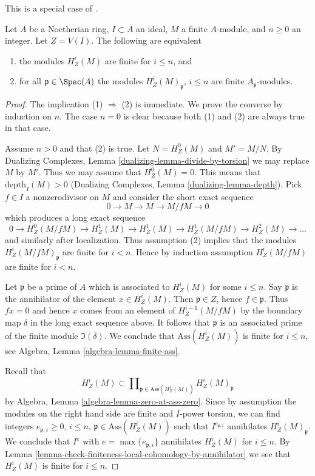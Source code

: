 \begin{lemma}
\label{lemma-check-finiteness-local-cohomology-locally}
\begin{reference}
This is a special case of \cite[Satz 1]{Faltings-finiteness}.
\end{reference}
Let $A$ be a Noetherian ring, $I \subset A$ an ideal, $M$ a finite
$A$-module, and $n \geq 0$ an integer. Let $Z = V(I)$.
The following are equivalent
\begin{enumerate}
\item the modules $H^i_Z(M)$ are finite for $i \leq n$, and
\item for all $\mathfrak p \in \Spec(A)$ the modules
$H^i_Z(M)_\mathfrak p$, $i \leq n$ are finite $A_\mathfrak p$-modules.
\end{enumerate}
\end{lemma}

\begin{proof}
The implication (1) $\Rightarrow$ (2) is immediate. We prove the converse
by induction on $n$. The case $n = 0$ is clear because both (1) and
(2) are always true in that case.

\medskip\noindent
Assume $n > 0$ and that (2) is true. Let $N = H^0_Z(M)$ and $M' = M/N$.
By Dualizing Complexes, Lemma \ref{dualizing-lemma-divide-by-torsion}
we may replace $M$ by $M'$.
Thus we may assume that $H^0_Z(M) = 0$.
This means that $\text{depth}_I(M) > 0$
(Dualizing Complexes, Lemma \ref{dualizing-lemma-depth}).
Pick $f \in I$ a nonzerodivisor on $M$ and consider the short
exact sequence
$$
0 \to M \to M \to M/fM \to 0
$$
which produces a long exact sequence
$$
0 \to H^0_Z(M/fM) \to H^1_Z(M) \to H^1_Z(M) \to H^1_Z(M/fM) \to
H^2_Z(M) \to \ldots
$$
and similarly after localization. Thus assumption (2) implies that
the modules $H^i_Z(M/fM)_\mathfrak p$ are finite for $i < n$. Hence
by induction assumption $H^i_Z(M/fM)$ are finite for $i < n$.

\medskip\noindent
Let $\mathfrak p$ be a prime of $A$ which is associated to
$H^i_Z(M)$ for some $i \leq n$. Say $\mathfrak p$ is the annihilator
of the element $x \in H^i_Z(M)$. Then $\mathfrak p \in Z$, hence
$f \in \mathfrak p$. Thus $fx = 0$ and hence $x$ comes from an
element of $H^{i - 1}_Z(M/fM)$ by the boundary map $\delta$ in the long
exact sequence above. It follows that $\mathfrak p$ is an associated
prime of the finite module $\Im(\delta)$. We conclude that
$\text{Ass}(H^i_Z(M))$ is finite for $i \leq n$, see
Algebra, Lemma \ref{algebra-lemma-finite-ass}.

\medskip\noindent
Recall that
$$
H^i_Z(M) \subset
\prod\nolimits_{\mathfrak p \in \text{Ass}(H^i_Z(M))}
H^i_Z(M)_\mathfrak p
$$
by Algebra, Lemma \ref{algebra-lemma-zero-at-ass-zero}. Since by
assumption the modules on the right hand side are finite and $I$-power
torsion, we can find integers $e_{\mathfrak p, i} \geq 0$, $i \leq n$,
$\mathfrak p \in \text{Ass}(H^i_Z(M))$ such that
$I^{e_{\mathfrak p, i}}$ annihilates $H^i_Z(M)_\mathfrak p$. We conclude
that $I^e$ with $e = \max\{e_{\mathfrak p, i}\}$ annihilates $H^i_Z(M)$
for $i \leq n$. By
Lemma \ref{lemma-check-finiteness-local-cohomology-by-annihilator}
we see that $H^i_Z(M)$ is finite for $i \leq n$.
\end{proof}